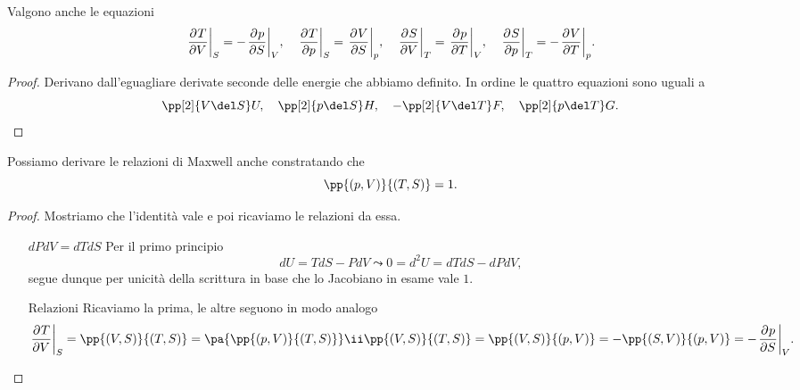 \begin{proposition}\label{RelazioniMaxwell}
Valgono anche le equazioni
\[\ppb VTS=-\ppb SpV,\quad \ppb pTS=\ppb SVp,\quad \ppb VST=\ppb TpV,\quad \ppb pST=-\ppb TVp.\]
\end{proposition}
\begin{proof}
Derivano dall'eguagliare derivate seconde delle energie che abbiamo definito. In ordine le quattro equazioni sono uguali a
\[\pp[2]{V\del S}U,\quad \pp[2]{p\del S}H,\quad -\pp[2]{V\del T}F,\quad \pp[2]{p\del T}G.\]
\end{proof}

\begin{remark}[Jacobiano $p,V$ - $T,S$]
Possiamo derivare le relazioni di Maxwell anche constratando che
\[\pp{(p,V)}{(T,S)}=1.\]
\end{remark}
\begin{proof}
Mostriamo che l'identit\`a vale e poi ricaviamo le relazioni da essa.
\setlength{\leftmargini}{0cm}
\begin{itemize}
\item[$\boxed{dPdV=dTdS}$] Per il primo principio
\[dU=TdS-PdV\leadsto 0=d^2U=dTdS-dPdV,\]
segue dunque per unicit\`a della scrittura in base che lo Jacobiano in esame vale $1$.
\item[$\boxed{\text{Relazioni}}$] Ricaviamo la prima, le altre seguono in modo analogo
\[\ppb VTS=\pp{(V,S)}{(T,S)}=\pa{\pp{(p,V)}{(T,S)}}\ii\pp{(V,S)}{(T,S)}=\pp{(V,S)}{(p,V)}=-\pp{(S,V)}{(p,V)}=-\ppb SpV.\]
\end{itemize}
\setlength{\leftmargini}{0.5cm}
\end{proof}




